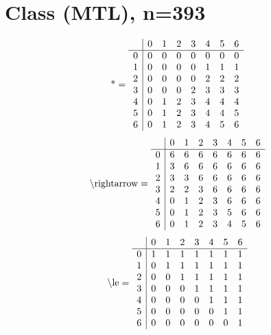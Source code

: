 \documentclass[11pt]{article}
\begin{document}
\section{Class (MTL), n=393}
\[\text{*} = 
\begin{array}{r | r r r r r r r}
 & 0 & 1 & 2 & 3 & 4 & 5 & 6 \\ \hline
0 & 0 & 0 & 0 & 0 & 0 & 0 & 0 \\
1 & 0 & 0 & 0 & 0 & 1 & 1 & 1 \\
2 & 0 & 0 & 0 & 0 & 2 & 2 & 2 \\
3 & 0 & 0 & 0 & 2 & 3 & 3 & 3 \\
4 & 0 & 1 & 2 & 3 & 4 & 4 & 4 \\
5 & 0 & 1 & 2 & 3 & 4 & 4 & 5 \\
6 & 0 & 1 & 2 & 3 & 4 & 5 & 6 \\
\end{array}
\]
\[\text{\textbackslash rightarrow} = 
\begin{array}{r | r r r r r r r}
 & 0 & 1 & 2 & 3 & 4 & 5 & 6 \\ \hline
0 & 6 & 6 & 6 & 6 & 6 & 6 & 6 \\
1 & 3 & 6 & 6 & 6 & 6 & 6 & 6 \\
2 & 3 & 3 & 6 & 6 & 6 & 6 & 6 \\
3 & 2 & 2 & 3 & 6 & 6 & 6 & 6 \\
4 & 0 & 1 & 2 & 3 & 6 & 6 & 6 \\
5 & 0 & 1 & 2 & 3 & 5 & 6 & 6 \\
6 & 0 & 1 & 2 & 3 & 4 & 5 & 6 \\
\end{array}
\]
\[\text{\textbackslash le} = 
\begin{array}{r | r r r r r r r}
 & 0 & 1 & 2 & 3 & 4 & 5 & 6 \\ \hline
0 & 1 & 1 & 1 & 1 & 1 & 1 & 1 \\
1 & 0 & 1 & 1 & 1 & 1 & 1 & 1 \\
2 & 0 & 0 & 1 & 1 & 1 & 1 & 1 \\
3 & 0 & 0 & 0 & 1 & 1 & 1 & 1 \\
4 & 0 & 0 & 0 & 0 & 1 & 1 & 1 \\
5 & 0 & 0 & 0 & 0 & 0 & 1 & 1 \\
6 & 0 & 0 & 0 & 0 & 0 & 0 & 1 \\
\end{array}
\]
\end{document}
